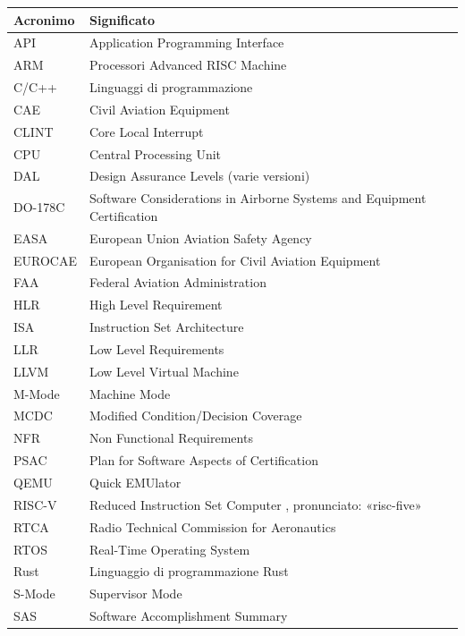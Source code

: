 \documentclass[italian, Lau, oneside]{sapthesis} %
\begin{document}
\begin{table}[h!]
\centering
\renewcommand{\arraystretch}{1.1}
\begin{tabular}{|l|p{10cm}|}
\hline
\textbf{Acronimo} & \textbf{Significato} \\ \hline
API     & Application Programming Interface \\ \hline
ARM     & Processori Advanced RISC Machine \\ \hline
C/C++   & Linguaggi di programmazione \\ \hline
CAE     & Civil Aviation Equipment \\ \hline
CLINT   & Core Local Interrupt \\ \hline
CPU     & Central Processing Unit \\ \hline
DAL     & Design Assurance Levels (varie versioni) \\ \hline
DO-178C & Software Considerations in Airborne Systems and Equipment Certification \\ \hline
EASA    & European Union Aviation Safety Agency \\ \hline
EUROCAE & European Organisation for Civil Aviation Equipment \\ \hline
FAA     & Federal Aviation Administration \\ \hline
HLR     & High Level Requirement \\ \hline
ISA     & Instruction Set Architecture \\ \hline
LLR     & Low Level Requirements \\ \hline
LLVM    & Low Level Virtual Machine \\ \hline
M-Mode  & Machine Mode \\ \hline
MCDC    & Modified Condition/Decision Coverage \\ \hline
NFR     & Non Functional Requirements \\ \hline
PSAC    & Plan for Software Aspects of Certification \\ \hline
QEMU    & Quick EMUlator \\ \hline
RISC-V  & Reduced Instruction Set Computer , pronunciato: «risc-five» \\ \hline
RTCA    & Radio Technical Commission for Aeronautics \\ \hline
RTOS    & Real-Time Operating System \\ \hline
Rust    & Linguaggio di programmazione Rust \\ \hline
S-Mode       & Supervisor Mode \\ \hline
SAS     & Software Accomplishment Summary \\ \hline

\end{tabular}
\end{table}
\end{document}
